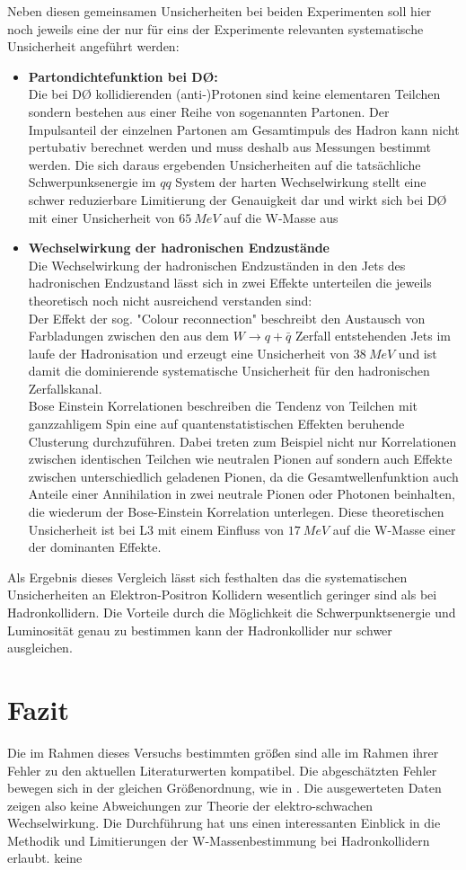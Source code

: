 \documentclass[a4paper,12pt]{article}
\begin{document}
Neben diesen gemeinsamen Unsicherheiten bei beiden Experimenten soll hier noch jeweils eine der nur für eins der Experimente relevanten
systematische Unsicherheit angeführt werden:
\begin{itemize}
	\item \textbf{Partondichtefunktion bei DØ:}\\
	Die bei DØ kollidierenden (anti-)Protonen sind keine elementaren Teilchen sondern bestehen aus einer Reihe von sogenannten Partonen. Der
	Impulsanteil der einzelnen Partonen am Gesamtimpuls des Hadron kann nicht pertubativ berechnet werden und muss deshalb aus Messungen bestimmt
	werden. Die sich daraus ergebenden Unsicherheiten auf die tatsächliche Schwerpunksenergie im $qq$ System der harten Wechselwirkung stellt eine
	schwer reduzierbare Limitierung der Genauigkeit dar und wirkt sich bei DØ mit einer Unsicherheit von $\SI{65}{MeV}$ auf die W-Masse aus
	\item \textbf{Wechselwirkung der hadronischen Endzustände}\\
	Die Wechselwirkung der hadronischen Endzuständen in den Jets des hadronischen Endzustand lässt sich in zwei Effekte unterteilen die jeweils
	theoretisch noch nicht ausreichend verstanden sind: \\
	Der Effekt der sog. "Colour reconnection" beschreibt den Austausch von Farbladungen zwischen
	den aus dem $W\rightarrow q+\bar{q}$ Zerfall entstehenden Jets im laufe der Hadronisation und erzeugt eine Unsicherheit von $\SI{38}{MeV}$
	und ist damit die dominierende systematische Unsicherheit für den hadronischen Zerfallskanal.\\
	Bose Einstein Korrelationen beschreiben die Tendenz von Teilchen mit ganzzahligem Spin eine auf quantenstatistischen Effekten beruhende Clusterung
	durchzuführen. Dabei treten zum Beispiel nicht nur Korrelationen zwischen identischen Teilchen wie neutralen Pionen auf sondern auch Effekte zwischen
	unterschiedlich geladenen Pionen, da die Gesamtwellenfunktion auch Anteile einer Annihilation in
	zwei neutrale Pionen oder Photonen beinhalten, die
	wiederum der Bose-Einstein Korrelation unterlegen. Diese theoretischen Unsicherheit ist bei L3 mit einem Einfluss von $\SI{17}{MeV}$ auf die W-Masse
	einer der dominanten Effekte.
\end{itemize}
Als Ergebnis dieses Vergleich lässt sich festhalten das die systematischen Unsicherheiten an Elektron-Positron Kollidern wesentlich geringer sind als
bei Hadronkollidern. Die Vorteile durch die Möglichkeit die Schwerpunktsenergie und Luminosität genau zu bestimmen kann der Hadronkollider nur schwer ausgleichen.
\section{Fazit}
Die im Rahmen dieses Versuchs bestimmten größen sind alle im Rahmen ihrer Fehler zu den aktuellen Literaturwerten kompatibel. Die abgeschätzten Fehler
bewegen sich in der gleichen Größenordnung, wie in \cite{Abachi:1996ey}. Die ausgewerteten Daten zeigen also keine Abweichungen zur Theorie der 
elektro-schwachen Wechselwirkung. Die Durchführung hat uns einen interessanten Einblick in die Methodik und Limitierungen der W-Massenbestimmung bei
Hadronkollidern erlaubt. 
keine

{}
\end{document}
